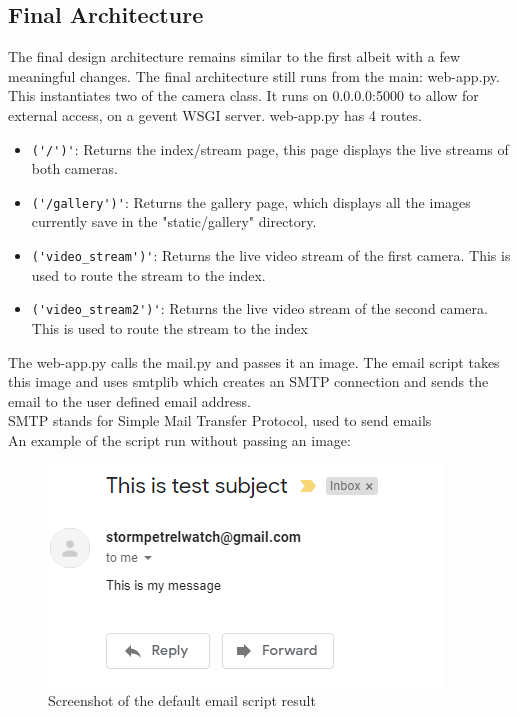     \subsection{Final Architecture}
    The final design architecture remains similar to the first albeit with a few meaningful changes.
    The final architecture still runs from the main: web-app.py. This instantiates two of the camera class. It runs on 0.0.0.0:5000 to allow for external access, on a gevent WSGI server. web-app.py has 4 routes. 
    \begin{itemize}
        \item \verb|('/')'|: Returns the index/stream page, this page displays the live streams of both cameras.
         \item  \verb|('/gallery')'|: Returns the gallery page, which displays all the images currently save in the "static/gallery" directory.
         \item \verb|('video_stream')'|: Returns the live video stream of the first camera. This is used to route the stream to the index.
          \item \verb|('video_stream2')'|: Returns the live video stream of the second camera. This is used to route the stream to the index
    \end{itemize}
   The web-app.py calls the mail.py and passes it an image. The email script takes this image and uses smtplib which creates an SMTP connection and sends the email to the user defined email address.\\SMTP stands for Simple Mail Transfer Protocol, used to send emails\cite{SMTP}\\An example of the script run without passing an image:   
   \begin{figure}[!htbp] 
       \centering
       \includegraphics[scale=1]{img/ssEmail.PNG}
       \caption{Screenshot of the default email script result}
       \label{fig:my_label}
   \end{figure}    
  
